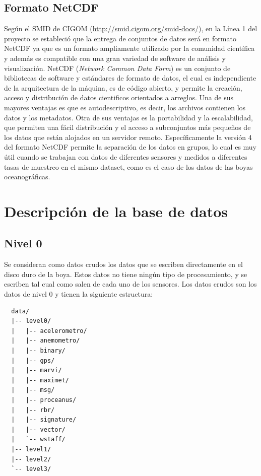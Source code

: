 \documentclass[11pt]{article}
\begin{document}
\subsection{Formato NetCDF}
\label{sub:formato_netcdf}

Según el SMID de CIGOM (\url{http://smid.cigom.org/smid-docs/}), en la Línea 1
del proyecto se estableció que la entrega de conjuntos de datos será en formato
NetCDF ya que es un formato ampliamente utilizado por la comunidad científica y
además es compatible con una gran variedad de software de análisis y
visualización. NetCDF (\emph{Network Common Data Form}) es un conjunto de
bibliotecas de software y estándares de formato de datos, el cual es
independiente de la arquitectura de la máquina, es de código abierto, y permite
la creación, acceso y distribución de datos cientificos orientados a arreglos.
Una de sus mayores ventajas es que es autodescriptivo, es decir, los archivos
contienen los datos y los metadatos. Otra de sus ventajas es la portabilidad y
la escalabilidad, que permiten una fácil distribución y el acceso a subconjuntos
más pequeños de los datos que están alojados en un servidor remoto.
Específicamente la versión 4 del formato NetCDF permite la separación de los
datos en grupos, lo cual es muy útil cuando se trabajan con datos de diferentes
sensores y medidos a diferentes tasas de muestreo en el mismo dataset, como es
el caso de los datos de las boyas oceanográficas.




\section{Descripción de la base de datos}%
\label{sec:descripcion_de_la_base_de_datos}

\subsection{Nivel 0} 
\label{sub:nivel_0}

Se consideran como datos crudos los datos que se escriben directamente en el
disco duro de la boya. Estos datos no tiene ningún tipo de procesamiento, y se
escriben tal cual como salen de cada uno de los sensores.  Los datos crudos son
los datos de nivel 0 y tienen la siguiente estructura:

\begin{verbatim}
  data/
  |-- level0/
  |   |-- acelerometro/
  |   |-- anemometro/
  |   |-- binary/
  |   |-- gps/
  |   |-- marvi/
  |   |-- maximet/
  |   |-- msg/
  |   |-- proceanus/
  |   |-- rbr/
  |   |-- signature/
  |   |-- vector/
  |   `-- wstaff/
  |-- level1/
  |-- level2/
  `-- level3/
\end{verbatim}
\end{document}
